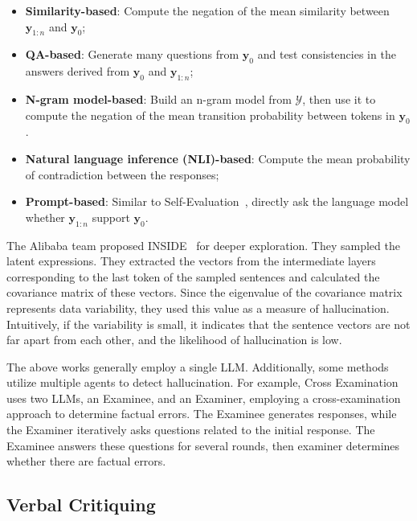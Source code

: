 \documentclass[lettersize,journal]{IEEEtran}
\begin{document}
\begin{itemize}
    \item \textbf{Similarity-based}: Compute the negation of the mean similarity between $\boldsymbol{y}_{1:n}$ and $\boldsymbol{y}_0$;
    \item \textbf{QA-based}: Generate many questions from $\boldsymbol{y}_0$ and test consistencies in the answers derived from $\boldsymbol{y}_0$ and $\boldsymbol{y}_{1:n}$;
    \item \textbf{N-gram model-based}: Build an n-gram model from $\mathcal{Y}$, then use it to compute the negation of the mean transition probability between tokens in $\boldsymbol{y}_0$.
    \item \textbf{Natural language inference (NLI)-based}: Compute the mean probability of contradiction between the responses;
    \item \textbf{Prompt-based}: Similar to Self-Evaluation~\cite{TheoryKnowKnow_22_arXiv_Anthropic}, directly ask the language model whether $\boldsymbol{y}_{1:n}$ support $\boldsymbol{y}_0$.
\end{itemize}

The Alibaba team proposed INSIDE~\cite{INSIDE_24_ICLR_Alibaba} for deeper exploration. They sampled the latent expressions. They extracted the vectors from the intermediate layers corresponding to the last token of the sampled sentences and calculated the covariance matrix of these vectors. Since the eigenvalue of the covariance matrix represents data variability, they used this value as a measure of hallucination. Intuitively, if the variability is small, it indicates that the sentence vectors are not far apart from each other, and the likelihood of hallucination is low.

The above works generally employ a single LLM. Additionally, some methods utilize multiple agents to detect hallucination. For example, Cross Examination~\cite{CrossExamine_23_EMNLP_TAU} uses two LLMs, an Examinee, and an Examiner, employing a cross-examination approach to determine factual errors. The Examinee generates responses, while the Examiner iteratively asks questions related to the initial response. The Examinee answers these questions for several rounds, then examiner determines whether there are factual errors.


\subsection{Verbal Critiquing}  \label{sec:critiquing}
\end{document}
